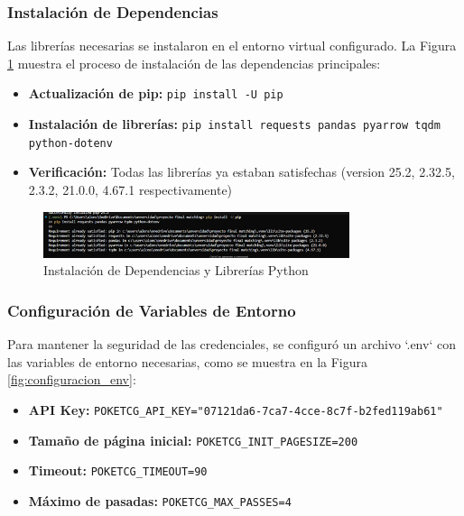 \documentclass[12pt,letterpaper]{article}
\begin{document}
\subsubsection{Instalación de Dependencias}

Las librerías necesarias se instalaron en el entorno virtual configurado. La Figura \ref{fig:instalacion_dependencias} muestra el proceso de instalación de las dependencias principales:

\begin{itemize}
    \item \textbf{Actualización de pip:} \texttt{pip install -U pip}
    \item \textbf{Instalación de librerías:} \texttt{pip install requests pandas pyarrow tqdm python-dotenv}
    \item \textbf{Verificación:} Todas las librerías ya estaban satisfechas (version 25.2, 2.32.5, 2.3.2, 21.0.0, 4.67.1 respectivamente)
\end{itemize}

\begin{figure}[H]
\centering
\includegraphics[width=0.8\textwidth]{imagenes/Imagen2.png}
\caption{Instalación de Dependencias y Librerías Python}
\label{fig:instalacion_dependencias}
\end{figure}

\subsubsection{Configuración de Variables de Entorno}

Para mantener la seguridad de las credenciales, se configuró un archivo `.env` con las variables de entorno necesarias, como se muestra en la Figura \ref{fig:configuracion_env}:

\begin{itemize}
    \item \textbf{API Key:} \texttt{POKETCG\_API\_KEY="07121da6-7ca7-4cce-8c7f-b2fed119ab61"}
    \item \textbf{Tamaño de página inicial:} \texttt{POKETCG\_INIT\_PAGESIZE=200}
    \item \textbf{Timeout:} \texttt{POKETCG\_TIMEOUT=90}
    \item \textbf{Máximo de pasadas:} \texttt{POKETCG\_MAX\_PASSES=4}
\end{itemize}
\end{document}
